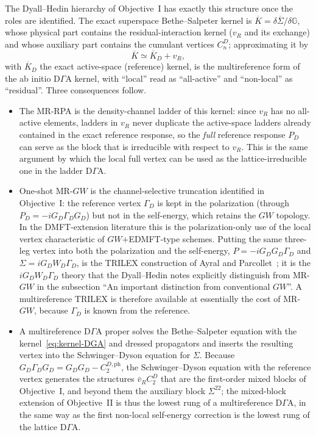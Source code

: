\documentclass[11pt,a4paper]{article}
\newcommand{\bbG}{\mathbb{G}}
\newcommand{\GW}{$GW$}
\newcommand{\MRGW}{MR-$GW$}
\newcommand{\DGA}{D$\Gamma$A}
\begin{document}
The Dyall--Hedin hierarchy of Objective~I has exactly this structure once the
roles are identified.  The exact superspace Bethe--Salpeter kernel is
$\overline K=\delta\overline\Sigma/\delta\bbG$, whose physical part contains
the residual-interaction kernel ($v_R$ and its exchange) and whose auxiliary
part contains the cumulant vertices $C_n^D$; approximating it by
\begin{equation}
  \overline K\simeq\overline K_D+v_R ,
  \label{eq:kernel-DGA}
\end{equation}
with $\overline K_D$ the exact active-space (reference) kernel, is the
multireference form of the ab initio \DGA{} kernel, with ``local'' read as
``all-active'' and ``non-local'' as ``residual''.  Three consequences follow.
\begin{itemize}[leftmargin=2em]
\item The MR-RPA is the density-channel ladder of this kernel: since $v_R$
  has no all-active elements, ladders in $v_R$ never duplicate the
  active-space ladders already contained in the exact reference response,
  so the \emph{full} reference response $P_D$ can serve as the block that is
  irreducible with respect to $v_R$.  This is the same argument by which the
  local full vertex can be used as the lattice-irreducible one in the ladder
  \DGA{}.
\item One-shot \MRGW{} is the channel-selective truncation identified in
  Objective~I: the reference vertex $\Gamma_D$ is kept in the polarization
  (through $P_D=-iG_D\Gamma_DG_D$) but not in the self-energy, which retains
  the $GW$ topology.  In the DMFT-extension literature this is the
  polarization-only use of the local vertex characteristic of
  \GW{}$+$EDMFT-type schemes.  Putting the same three-leg vertex into both
  the polarization and the self-energy, $P=-iG_DG_D\Gamma_D$ and
  $\Sigma=iG_DW_D\Gamma_D$, is the TRILEX construction of Ayral and
  Parcollet~\cite{AyralParcollet2015}; it is the $iG_DW_D\Gamma_D$ theory that
  the Dyall--Hedin notes explicitly distinguish from \MRGW{} in the subsection
  ``An important distinction from conventional $GW$''.  A multireference
  TRILEX is therefore available at essentially the cost of \MRGW{}, because
  $\Gamma_D$ is known from the reference.
\item A multireference \DGA{} proper solves the Bethe--Salpeter equation with
  the kernel~\eqref{eq:kernel-DGA} and dressed propagators and inserts the
  resulting vertex into the Schwinger--Dyson equation for $\Sigma$.  Because
  $G_D\Gamma_DG_D=G_DG_D-C_2^{D,\mathrm{ph}}$, the Schwinger--Dyson equation
  with the reference vertex generates the structures $\bar v_RC_2^D$ that are
  the first-order mixed blocks of Objective~I, and beyond them the auxiliary
  block $\Sigma^{22}$; the mixed-block extension of Objective~II is thus the
  lowest rung of a multireference \DGA{}, in the same way as the first
  non-local self-energy correction is the lowest rung of the lattice \DGA{}.
\end{itemize}
\end{document}
